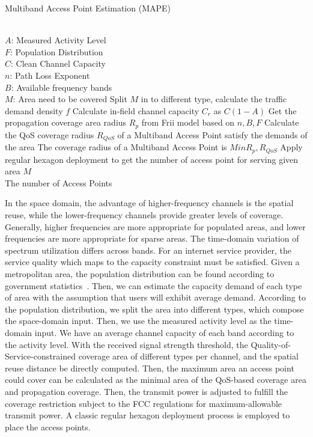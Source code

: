 \begin{algorithm}[t]
\small
\caption{Multiband Access Point Estimation (MAPE)}
\label{algorithm:mape}
\begin{algorithmic}[1]
\REQUIRE  ~~\\
$A$: Measured Activity Level \\
$F$: Population Distribution\\
$C$: Clean Channel Capacity\\
$n$: Path Loss Exponent \\
$B$: Available frequency bands\\
$M$: Area need to be covered
\STATE Split $M$ in to different type, calculate the traffic demand density $f$
\STATE Calculate in-field channel capacity $C_r$ as $C(1-A)$
\STATE Get the propagation coverage area radius $R_p$ from Frii model based on $n,B,F$
\STATE Calculate the QoS coverage radius $R_{QoS}$ of a Multiband Access Point satisfy the demands of the area
\STATE The coverage radius of a Multiband Access Point is $Min{R_p,R_{QoS}}$
\STATE Apply regular hexagon deployment to get the number of access point for serving given area $M$
\ENSURE ~~\\
The number of Access Points\\
\end{algorithmic}
\end{algorithm}

In the space domain, the advantage of higher-frequency channels is the spatial reuse, while
the lower-frequency channels provide greater levels of coverage. Generally, higher 
frequencies are more appropriate for populated areas, and lower frequencies are
more appropriate for sparse areas. The time-domain variation of spectrum utilization 
differs across bands.
For an internet service provider, the service quality which maps to the capacity constraint must be satisfied.
Given a metropolitan area, the population distribution can be found according to
government statistics~\cite{uscensus}. Then, we can estimate the capacity demand
of each type of area with the assumption that users will exhibit average demand.
According to the population distribution, we split the area into different types,
which compose the space-domain input. Then, we use the measured activity level as 
the time-domain input. We have an average channel capacity of each band according to the 
activity level. With the received signal strength threshold, the Quality-of-Service-constrained
coverage area of different types per channel, and the spatial reuse distance be directly
computed. Then, the maximum area an access point could cover can be calculated as the minimal
area of the QoS-based coverage area and propagation coverage.
Then, the transmit power is adjusted to fulfill the coverage restriction subject to
the FCC regulations for maximum-allowable transmit power. 
A classic regular hexagon deployment process is employed to place the access points.




